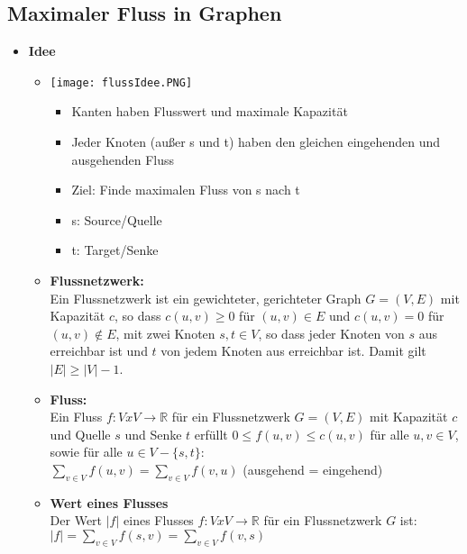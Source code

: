 \subsection{Maximaler Fluss in Graphen}
    \begin{itemize}
        \item \textbf{Idee}
            \begin{itemize}
                \item[]
                    \begin{minipage}{0.35\textwidth}
                        \texttt{[image: flussIdee.PNG]}
                    \end{minipage}
                    \begin{minipage}{0.55\textwidth}
                        \begin{itemize}
                            \item Kanten haben Flusswert und maximale Kapazität
                            \item Jeder Knoten (außer s und t) haben den gleichen eingehenden und ausgehenden Fluss
                            \item Ziel: Finde maximalen Fluss von s nach t
                            \item s: Source/Quelle
                            \item t: Target/Senke
                        \end{itemize}
                    \end{minipage}
                \item \textbf{Flussnetzwerk:} \\
                        Ein Flussnetzwerk ist ein gewichteter, gerichteter Graph $G=(V,E)$ mit Kapazität $c$, so dass
                        $c(u,v) \geq 0$ für $(u,v) \in E$ und $c(u,v) = 0$ für $(u,v) \notin E$, mit zwei Knoten $s,t \in V$,
                        so dass jeder Knoten von $s$ aus erreichbar ist und $t$ von jedem Knoten aus erreichbar ist. 
                        Damit gilt $|E| \geq |V| - 1$.
                \item \textbf{Fluss:} \\
                        Ein Fluss $f: V x V \rightarrow \mathbb{R}$ für ein Flussnetzwerk $G = (V,E)$ mit Kapazität $c$
                        und Quelle $s$ und Senke $t$ erfüllt $0 \leq f(u,v) \leq c(u,v)$ für alle $u,v \in V$, sowie für alle
                        $u \in V - \{s,t\}$: \\ 
                        $\sum_{v\in V} f(u,v) = \sum_{v\in V} f(v,u)$ (ausgehend = eingehend)
                \item \textbf{Wert eines Flusses} \\
                        Der Wert $|f|$ eines Flusses $f: V x V \rightarrow \mathbb{R}$ für ein Flussnetzwerk $G$ ist: \\
                        $|f| = \sum_{v\in V} f(s,v) = \sum_{v\in V} f(v,s)$
            \end{itemize}


\end{itemize}
